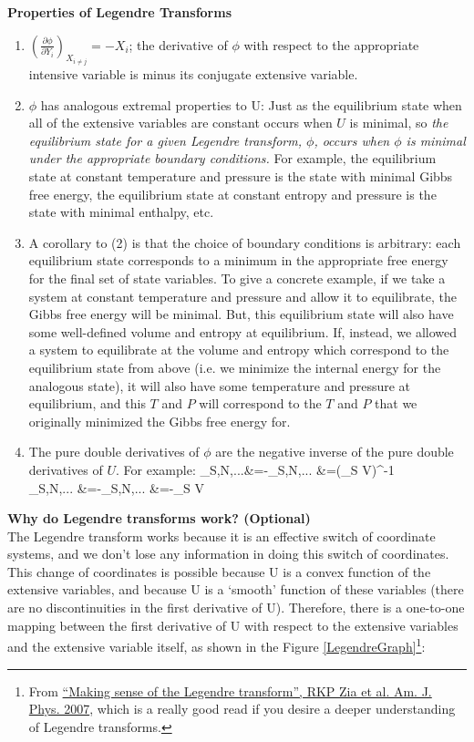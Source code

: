 \documentclass[12pt]{article}
\begin{document}
\textbf{Properties of Legendre Transforms}\\
\begin{enumerate}
\item $\left(\frac{\partial \phi}{\partial Y_i}\right)_{X_{i\neq j}}=-X_i$; the derivative of $\phi$ with respect to the appropriate intensive variable is minus its conjugate extensive variable.
\item $\phi$ has analogous extremal properties to U: Just as the equilibrium state when all of the extensive variables are constant occurs when $U$ is minimal, so \emph{the equilibrium state for a given Legendre transform, $\phi$, occurs when $\phi$ is minimal under the appropriate boundary conditions.} For example, the equilibrium state at constant temperature and pressure is the state with minimal Gibbs free energy, the equilibrium state at constant entropy and pressure is the state with minimal enthalpy, etc. 
\item A corollary to (2) is that the choice of boundary conditions is arbitrary: each equilibrium state corresponds to a minimum in the appropriate free energy for the final set of state variables. To give a concrete example, if we take a system at constant temperature and pressure and allow it to equilibrate, the Gibbs free energy will be minimal. But, this equilibrium state will also have some well-defined volume and entropy at equilibrium. If, instead, we allowed a system to equilibrate at the volume and entropy which correspond to the equilibrium state from above (i.e. we minimize the internal energy for the analogous state), it will also have some temperature and pressure at equilibrium, and this $T$ and $P$ will correspond to the $T$ and $P$ that we originally minimized the Gibbs free energy for.
\item The pure double derivatives of $\phi$ are the negative inverse of the pure double derivatives of $U$. For example:
 \eqs {}_{S,N,...}&=-_{S,N,...} &=(\beta_S V)^{-1}\\
 _{S,N,...} &=-_{S,N,...} &=-\beta_S V \eqe
\end{enumerate}

\textbf{Why do Legendre transforms work? (Optional)}\\
The Legendre transform works because it is an effective switch of coordinate systems, and we don't lose any information in doing this switch of coordinates. This change of coordinates is possible because U is a convex function of the extensive variables, and because U is a `smooth' function of these variables (there are no discontinuities in the first derivative of U). Therefore, there is a one-to-one mapping between the first derivative of U with respect to the extensive variables and the extensive variable itself, as shown in the Figure \ref{LegendreGraph}\footnote{From \href{http://dx.doi.org/10.1119/1.3119512}{``Making sense of the Legendre transform'', RKP Zia et al. Am. J. Phys. 2007}, which is a really good read if you desire a deeper understanding of Legendre transforms.}:
\end{document}
